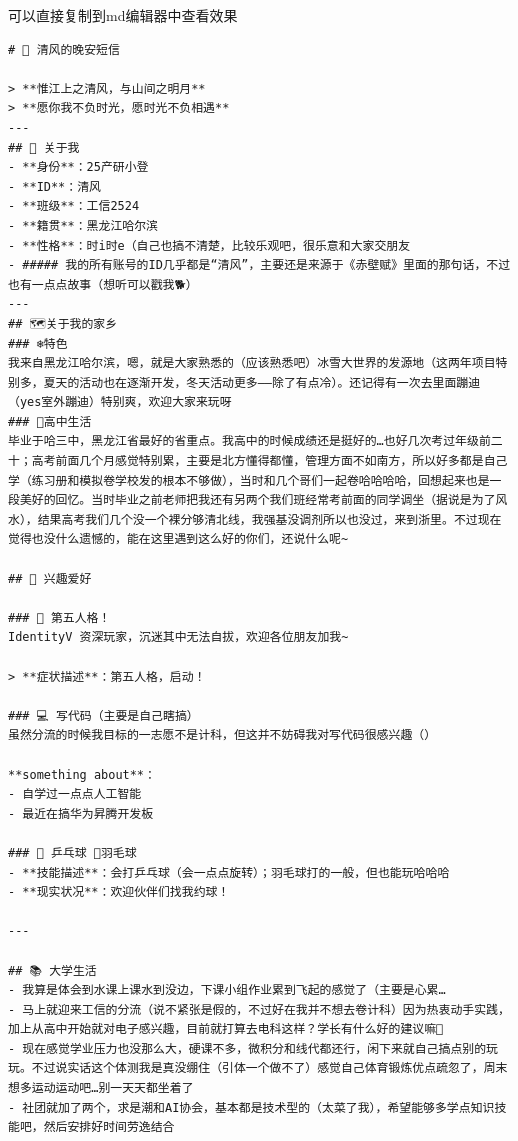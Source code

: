 \documentclass{book}
\begin{document}
可以直接复制到md编辑器中查看效果
    \begin{lstlisting}[style=markdownstyle]
    # 🌙 清风的晚安短信

> **惟江上之清风，与山间之明月**
> **愿你我不负时光，愿时光不负相遇**
---
## 👤 关于我
- **身份**：25产研小登
- **ID**：清风
- **班级**：工信2524
- **籍贯**：黑龙江哈尔滨
- **性格**：时i时e（自己也搞不清楚，比较乐观吧，很乐意和大家交朋友
- ##### 我的所有账号的ID几乎都是“清风”，主要还是来源于《赤壁赋》里面的那句话，不过也有一点点故事（想听可以戳我🐕）
---
## 🗺️关于我的家乡
### ❄️特色
我来自黑龙江哈尔滨，嗯，就是大家熟悉的（应该熟悉吧）冰雪大世界的发源地（这两年项目特别多，夏天的活动也在逐渐开发，冬天活动更多——除了有点冷）。还记得有一次去里面蹦迪（yes室外蹦迪）特别爽，欢迎大家来玩呀
### 📖高中生活
毕业于哈三中，黑龙江省最好的省重点。我高中的时候成绩还是挺好的…也好几次考过年级前二十；高考前面几个月感觉特别累，主要是北方懂得都懂，管理方面不如南方，所以好多都是自己学（练习册和模拟卷学校发的根本不够做），当时和几个哥们一起卷哈哈哈哈，回想起来也是一段美好的回忆。当时毕业之前老师把我还有另两个我们班经常考前面的同学调坐（据说是为了风水），结果高考我们几个没一个裸分够清北线，我强基没调剂所以也没过，来到浙里。不过现在觉得也没什么遗憾的，能在这里遇到这么好的你们，还说什么呢~

## 💫 兴趣爱好

### 🎌 第五人格！
IdentityV 资深玩家，沉迷其中无法自拔，欢迎各位朋友加我~

> **症状描述**：第五人格，启动！

### 💻 写代码（主要是自己瞎搞）
虽然分流的时候我目标的一志愿不是计科，但这并不妨碍我对写代码很感兴趣（）

**something about**：
- 自学过一点点人工智能
- 最近在搞华为昇腾开发板

### 🏓 乒乓球 🏸羽毛球
- **技能描述**：会打乒乓球（会一点点旋转）；羽毛球打的一般，但也能玩哈哈哈
- **现实状况**：欢迎伙伴们找我约球！

---

## 📚 大学生活
- 我算是体会到水课上课水到没边，下课小组作业累到飞起的感觉了（主要是心累…
- 马上就迎来工信的分流（说不紧张是假的，不过好在我并不想去卷计科）因为热衷动手实践，加上从高中开始就对电子感兴趣，目前就打算去电科这样？学长有什么好的建议嘛🥹
- 现在感觉学业压力也没那么大，硬课不多，微积分和线代都还行，闲下来就自己搞点别的玩玩。不过说实话这个体测我是真没绷住（引体一个做不了）感觉自己体育锻炼优点疏忽了，周末想多运动运动吧…别一天天都坐着了
- 社团就加了两个，求是潮和AI协会，基本都是技术型的（太菜了我），希望能够多学点知识技能吧，然后安排好时间劳逸结合


\end{lstlisting}
\end{document}
